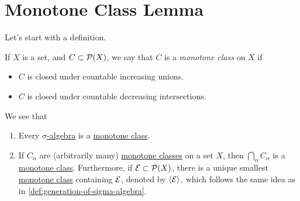 \section{Monotone Class Lemma}
Let's start with a definition.
\begin{definition}\label{def:monotone-class}
	If \(X\) is a set, and \(C\subset \mathcal{\MakeUppercase{p}} (X)\), we say that \(C\) is a \emph{monotone class} on \(X\) if
	\begin{itemize}
		\item \(C\) is closed under countable increasing unions.
		\item \(C\) is closed under countable decreasing intersections.
	\end{itemize}
\end{definition}

\begin{eg}
	We see that
	\begin{enumerate}
		\item Every \hyperref[def:sigma-algebra]{\(\sigma\)-algebra} is a \hyperref[def:monotone-class]{monotone class}.
		\item If \(C_\alpha \) are (arbitrarily many) \hyperref[def:monotone-class]{monotone classes} on a set \(X\), then \(\bigcap\limits_{\alpha}C_\alpha  \)
		      is a \hyperref[def:monotone-class]{monotone class}. Furthermore, if \(\mathcal{\MakeUppercase{e}} \subset \mathcal{\MakeUppercase{p}} (X)\), there is a unique smallest
		      \hyperref[def:monotone-class]{monotone class} containing \(\mathcal{\MakeUppercase{e}}\), denoted by \(\left< \mathcal{\MakeUppercase{e}}  \right> \), which follows the same
		      idea as in \autoref{def:generation-of-sigma-algebra}.
	\end{enumerate}
\end{eg}

